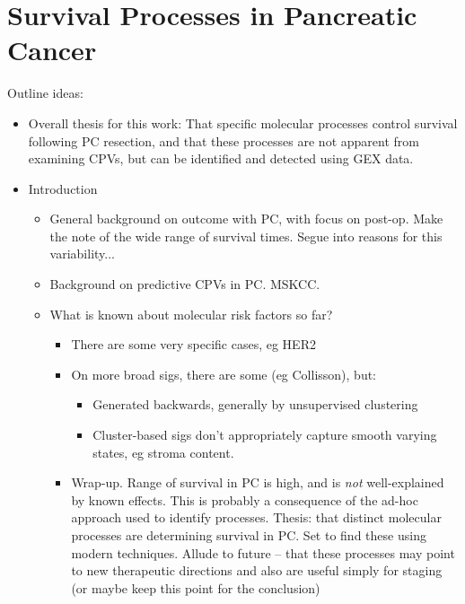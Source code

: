 \documentclass[thesis.tex]{subfiles}
\begin{document}
\chapter{Survival Processes in Pancreatic Cancer}
\label{ch:prognostic}

Outline ideas:
\begin{itemize}
  \item Overall thesis for this work: That specific molecular processes control survival following PC resection, and that these processes are not apparent from examining CPVs, but can be identified and detected using GEX data.
  \item Introduction
  \begin{itemize}
    \item General background on outcome with PC, with focus on post-op.  Make the note of the wide range of survival times.  Segue into reasons for this variability...
    \item Background on predictive CPVs in PC.  MSKCC.
    \item What is known about molecular risk factors so far?
    \begin{itemize}
      \item There are some very specific cases, eg HER2
      \item On more broad sigs, there are some (eg Collisson), but:
      \begin{itemize}
        \item Generated backwards, generally by unsupervised clustering
        \item Cluster-based sigs don't appropriately capture smooth varying states, eg stroma content.
      \end{itemize}
    \item Wrap-up.  Range of survival in PC is high, and is \emph{not} well-explained by known effects.  This is probably a consequence of the ad-hoc approach used to identify processes.  Thesis: that distinct molecular processes are determining survival in PC.  Set to find these using modern techniques.  Allude to future -- that these processes may point to new therapeutic directions and also are useful simply for staging (or maybe keep this point for the conclusion)
    \end{itemize}
  \end{itemize}
  

\end{itemize}
\end{document}
